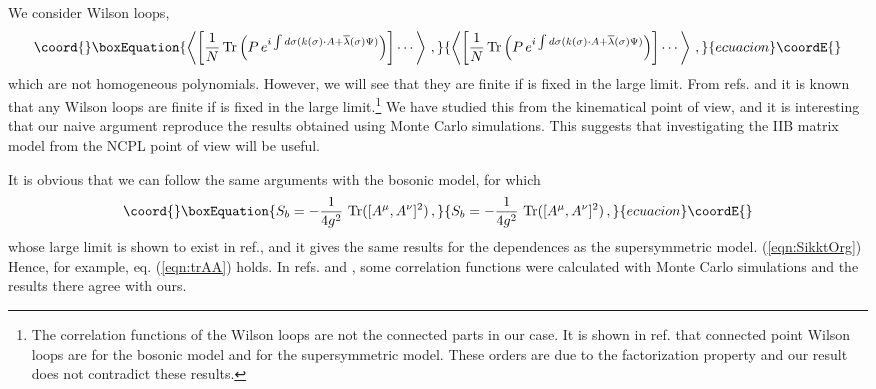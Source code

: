 \documentclass[12pt,a4paper]{article}
\providecommand{\Tr}{\mbox{\rm Tr}}
\begin{document}
We consider Wilson loops,
\begin{equation}\coord{}\boxEquation{
  \left\langle\left[{\frac{1}{N}}\,\Tr \left( P\,
	e^{i\int d\sigma(k(\sigma)\cdot A+{\overline\lambda}(\sigma)\Psi)}
	\right)\right]\cdots\right\rangle\,,\label{eqn:WilsonLoop}
}{
  \left\langle\left[{\frac{1}{N}}\,\Tr \left( P\,
	e^{i\int d\sigma(k(\sigma)\cdot A+{\overline\lambda}(\sigma)\Psi)}
	\right)\right]\cdots\right\rangle\,,}{ecuacion}\coordE{}\end{equation}
which are not homogeneous polynomials. However, we will see that
they are finite if \coordHE{} is fixed in the large \coordHE{} limit.
{}From refs. \cite{MCsimu,alpha} and \cite{AABHN} it is known
that any Wilson loops are finite if \coordHE{} is fixed in the large \coordHE{}
limit.\footnote{The correlation functions of the Wilson loops are not
the connected parts in our case. It is shown in ref.\cite{AABHN} that
connected \coordHE{} point Wilson loops are \coordHE{} for the bosonic
model and \coordHE{} for the supersymmetric model. These orders are
due to the factorization property and our result does not contradict
these results.}
We have studied this from the kinematical point of view, and
it is interesting that our naive argument reproduce the
results obtained using Monte Carlo simulations.
This suggests that investigating the IIB matrix model from the NCPL
point of view will be useful.

It is obvious that we can follow the same arguments with
the bosonic model, for which
\begin{equation}\coord{}\boxEquation{
  S_b=-\frac{1}{4g^2}~\Tr ([A^\mu,A^\nu]^2)\,,\label{eqn:Bmodel}
}{
  S_b=-\frac{1}{4g^2}~\Tr ([A^\mu,A^\nu]^2)\,,}{ecuacion}\coordE{}\end{equation}
whose large \coordHE{} limit is shown to exist in ref.\cite{KS}, and it gives
the same results for the \coordHE{} dependences as the supersymmetric model.
(\ref{eqn:SikktOrg})  Hence, for example, eq. (\ref{eqn:trAA}) holds.
In refs. \cite{MCsimu} and \cite{alpha}, some correlation functions
were calculated with Monte Carlo simulations and the results there agree
with ours.

\end{document}
